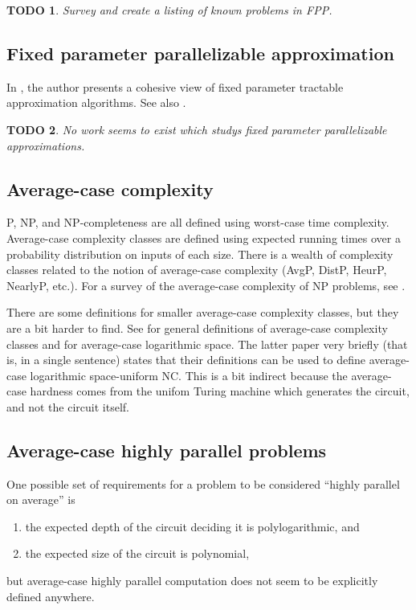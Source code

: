 \documentclass{article}
\newtheorem{todo}{TODO}
\begin{document}
\begin{todo}
  Survey and create a listing of known problems in \textsl{\textsf{FPP}}.
\end{todo}

\subsection{Fixed parameter parallelizable approximation}

In \cite{marx07}, the author presents a cohesive view of fixed parameter tractable approximation algorithms.
See also \cite{ch10}.

\begin{todo}
  No work seems to exist which studys fixed parameter parallelizable approximations.
\end{todo}

\subsection{Average-case complexity}

\textsf{P}, \textsf{NP}, and \textsf{NP}-completeness are all defined using worst-case time complexity.
Average-case complexity classes are defined using expected running times over a probability distribution on inputs of each size.
There is a wealth of complexity classes related to the notion of average-case complexity (\textsf{AvgP}, \textsf{DistP}, \textsf{HeurP}, \textsf{NearlyP}, etc.).
For a survey of the average-case complexity of \textsf{NP} problems, see \cite{bt06}.

There are some definitions for smaller average-case complexity classes, but they are a bit harder to find.
See \cite[Section~3.5.1]{yamakami97} for general definitions of average-case complexity classes and \cite[Section~7]{bcgl89} for average-case logarithmic space.
The latter paper very briefly (that is, in a single sentence) states that their definitions can be used to define average-case logarithmic space-uniform \textsf{NC}.
This is a bit indirect because the average-case hardness comes from the unifom Turing machine which generates the circuit, and not the circuit itself.

\subsection{Average-case highly parallel problems}

One possible set of requirements for a problem to be considered ``highly parallel on average'' is
\begin{enumerate}
  \item the expected depth of the circuit deciding it is polylogarithmic, and
  \item the expected size of the circuit is polynomial,
\end{enumerate}
but average-case highly parallel computation does not seem to be explicitly defined anywhere.
\end{document}
